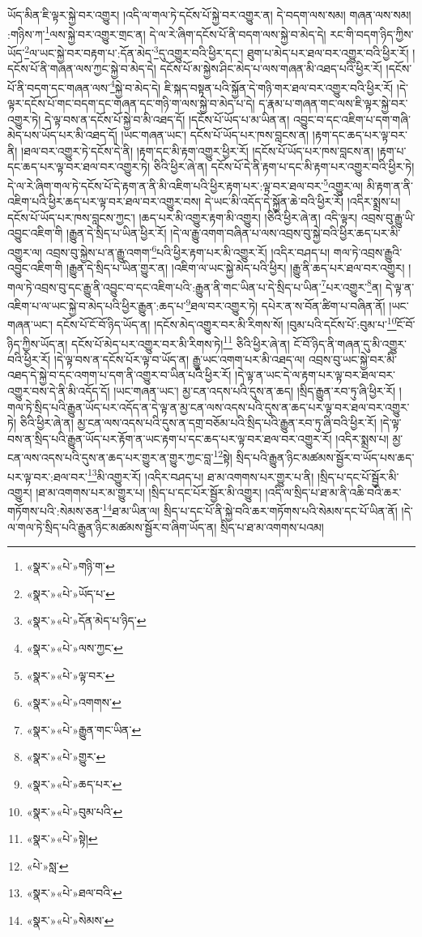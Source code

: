 ཡོད་མིན་ཇི་ལྟར་སྐྱེ་བར་འགྱུར། །འདི་ལ་གལ་ཏེ་དངོས་པོ་སྐྱེ་བར་འགྱུར་ན། དེ་བདག་ལས་སམ། གཞན་ལས་སམ། :གཉིས་ཀ་\footnote{«སྣར་»«པེ་»གཉི་ག་}ལས་སྐྱེ་བར་འགྱུར་གྲང་ན། དེ་ལ་རེ་ཞིག་དངོས་པོ་ནི་བདག་ལས་སྐྱེ་བ་མེད་དེ། རང་གི་བདག་ཉིད་ཀྱིས་ཡོད་\footnote{«སྣར་»«པེ་»ཡོད་པ་}ལ་ཡང་སྐྱེ་བར་བརྟག་པ་:དོན་མེད་\footnote{«སྣར་»«པེ་»དོན་མེད་པ་ཉིད་}དུ་འགྱུར་བའི་ཕྱིར་དང་། ཐུག་པ་མེད་པར་ཐལ་བར་འགྱུར་བའི་ཕྱིར་རོ། །དངོས་པོ་ནི་གཞན་ལས་ཀྱང་སྐྱེ་བ་མེད་དེ། དངོས་པོ་མ་སྐྱེས་ཤིང་མེད་པ་ལས་གཞན་མི་འཐད་པའི་ཕྱིར་རོ། །དངོས་པོ་ནི་བདག་དང་གཞན་ལས་\footnote{«སྣར་»«པེ་»ལས་ཀྱང་}སྐྱེ་བ་མེད་དེ། ཇི་སྐད་བསྟན་པའི་སྐྱོན་དེ་གཉི་གར་ཐལ་བར་འགྱུར་བའི་ཕྱིར་རོ། །དེ་ལྟར་དངོས་པོ་གང་བདག་དང་གཞན་དང་གཉི་ག་ལས་སྐྱེ་བ་མེད་པ་དེ། ད་རྣམ་པ་གཞན་གང་ལས་ཇི་ལྟར་སྐྱེ་བར་འགྱུར་ཏེ། དེ་ལྟ་བས་ན་དངོས་པོ་སྐྱེ་བ་མི་འཐད་དོ། །དངོས་པོ་ཡོད་པ་མ་ཡིན་ན། འབྱུང་བ་དང་འཇིག་པ་དག་གཞི་མེད་པས་ཡོད་པར་མི་འཐད་དོ། །ཡང་གཞན་ཡང་། དངོས་པོ་ཡོད་པར་ཁས་བླངས་ན། །རྟག་དང་ཆད་པར་ལྟ་བར་ནི། །ཐལ་བར་འགྱུར་ཏེ་དངོས་དེ་ནི། །རྟག་དང་མི་རྟག་འགྱུར་ཕྱིར་རོ། །དངོས་པོ་ཡོད་པར་ཁས་བླངས་ན། །རྟག་པ་དང་ཆད་པར་ལྟ་བར་ཐལ་བར་འགྱུར་ཏེ། ཅིའི་ཕྱིར་ཞེ་ན། དངོས་པོ་དེ་ནི་རྟག་པ་དང་མི་རྟག་པར་འགྱུར་བའི་ཕྱིར་ཏེ། དེ་ལ་རེ་ཞིག་གལ་ཏེ་དངོས་པོ་དེ་རྟག་ན་ནི་མི་འཇིག་པའི་ཕྱིར་རྟག་པར་:ལྟ་བར་ཐལ་བར་\footnote{«སྣར་»«པེ་»ལྟ་བར་}འགྱུར་ལ། མི་རྟག་ན་ནི་འཇིག་པའི་ཕྱིར་ཆད་པར་ལྟ་བར་ཐལ་བར་འགྱུར་བས། དེ་ཡང་མི་འདོད་དེ་སྐྱོན་ཆེ་བའི་ཕྱིར་རོ། །འདིར་སྨྲས་པ། དངོས་པོ་ཡོད་པར་ཁས་བླངས་ཀྱང་། །ཆད་པར་མི་འགྱུར་རྟག་མི་འགྱུར། །ཅིའི་ཕྱིར་ཞེ་ན། འདི་ལྟར། འབྲས་བུ་རྒྱུ་ཡི་འབྱུང་འཇིག་གི །རྒྱུན་དེ་སྲིད་པ་ཡིན་ཕྱིར་རོ། །དེ་ལ་རྒྱུ་འགག་བཞིན་པ་ལས་འབྲས་བུ་སྐྱེ་བའི་ཕྱིར་ཆད་པར་མི་འགྱུར་ལ། འབྲས་བུ་སྐྱེས་པ་ན་རྒྱུ་འགག་\footnote{«སྣར་»«པེ་»འགགས་}པའི་ཕྱིར་རྟག་པར་མི་འགྱུར་རོ། །འདིར་བཤད་པ། གལ་ཏེ་འབྲས་རྒྱུའི་འབྱུང་འཇིག་གི །རྒྱུན་དེ་སྲིད་པ་ཡིན་གྱུར་ན། །འཇིག་ལ་ཡང་སྐྱེ་མེད་པའི་ཕྱིར། །རྒྱུ་ནི་ཆད་པར་ཐལ་བར་འགྱུར། །གལ་ཏེ་འབྲས་བུ་དང་རྒྱུ་ནི་འབྱུང་བ་དང་འཇིག་པའི་:རྒྱུན་ནི་གང་ཡིན་པ་དེ་སྲིད་པ་ཡིན་\footnote{«སྣར་»«པེ་»རྒྱུན་གང་ཡིན་}པར་འགྱུར་\footnote{«སྣར་»«པེ་»གྱུར་}ན། དེ་ལྟ་ན་འཇིག་པ་ལ་ཡང་སྐྱེ་བ་མེད་པའི་ཕྱིར་རྒྱུན་:ཆད་པ་\footnote{«སྣར་»«པེ་»ཆད་པར་}ཐལ་བར་འགྱུར་ཏེ། དཔེར་ན་ས་བོན་ཚིག་པ་བཞིན་ནོ། །ཡང་གཞན་ཡང་། དངོས་པོ་ངོ་བོ་ཉིད་ཡོད་ན། །དངོས་མེད་འགྱུར་བར་མི་རིགས་སོ། །བུམ་པའི་དངོས་པོ་:བུམ་པ་\footnote{«སྣར་»«པེ་»བུམ་པའི་}ངོ་བོ་ཉིད་ཀྱིས་ཡོད་ན། དངོས་པོ་མེད་པར་འགྱུར་བར་མི་རིགས་ཏེ།\footnote{«སྣར་»«པེ་»སྟེ།} ཅིའི་ཕྱིར་ཞེ་ན། ངོ་བོ་ཉིད་ནི་གཞན་དུ་མི་འགྱུར་བའི་ཕྱིར་རོ། །དེ་ལྟ་བས་ན་དངོས་པོར་ལྟ་བ་ཡོད་ན། རྒྱུ་ཡང་འགག་པར་མི་འཐད་ལ། འབྲས་བུ་ཡང་སྐྱེ་བར་མི་འཐད་དེ་སྐྱེ་བ་དང་འགག་པ་དག་ནི་འགྱུར་བ་ཡིན་པའི་ཕྱིར་རོ། །དེ་ལྟ་ན་ཡང་དེ་ལ་རྟག་པར་ལྟ་བར་ཐལ་བར་འགྱུར་བས་དེ་ནི་མི་འདོད་དོ། །ཡང་གཞན་ཡང་། མྱ་ངན་འདས་པའི་དུས་ན་ཆད། །སྲིད་རྒྱུན་རབ་ཏུ་ཞི་ཕྱིར་རོ། །གལ་ཏེ་སྲིད་པའི་རྒྱུན་ཡོད་པར་འདོད་ན་དེ་ལྟ་ན་མྱ་ངན་ལས་འདས་པའི་དུས་ན་ཆད་པར་ལྟ་བར་ཐལ་བར་འགྱུར་ཏེ། ཅིའི་ཕྱིར་ཞེ་ན། མྱ་ངན་ལས་འདས་པའི་དུས་ན་དགྲ་བཅོམ་པའི་སྲིད་པའི་རྒྱུན་རབ་ཏུ་ཞི་བའི་ཕྱིར་རོ། །དེ་ལྟ་བས་ན་སྲིད་པའི་རྒྱུན་ཡོད་པར་རྟོག་ན་ཡང་རྟག་པ་དང་ཆད་པར་ལྟ་བར་ཐལ་བར་འགྱུར་རོ། །འདིར་སྨྲས་པ། མྱ་ངན་ལས་འདས་པའི་དུས་ན་ཆད་པར་གྱུར་ན་གྱུར་ཀྱང་བླ་\footnote{«པེ་»སླ་}སྟེ། སྲིད་པའི་རྒྱུན་ཉིང་མཚམས་སྦྱོར་བ་ཡོད་པས་ཆད་པར་ལྟ་བར་:ཐལ་བར་\footnote{«སྣར་»«པེ་»ཐལ་བའི་}མི་འགྱུར་རོ། །འདིར་བཤད་པ། ཐ་མ་འགགས་པར་གྱུར་པ་ནི། །སྲིད་པ་དང་པོ་སྦྱོར་མི་འགྱུར། །ཐ་མ་འགགས་པར་མ་གྱུར་པ། །སྲིད་པ་དང་པོར་སྦྱོར་མི་འགྱུར། །འདི་ལ་སྲིད་པ་ཐ་མ་ནི་འཆི་བའི་ཆར་གཏོགས་པའི་:སེམས་ཅན་\footnote{«སྣར་»«པེ་»སེམས་}ཐ་མ་ཡིན་ལ། སྲིད་པ་དང་པོ་ནི་སྐྱེ་བའི་ཆར་གཏོགས་པའི་སེམས་དང་པོ་ཡིན་ནོ། །དེ་ལ་གལ་ཏེ་སྲིད་པའི་རྒྱུན་ཉིང་མཚམས་སྦྱོར་བ་ཞིག་ཡོད་ན། སྲིད་པ་ཐ་མ་འགགས་པའམ། 